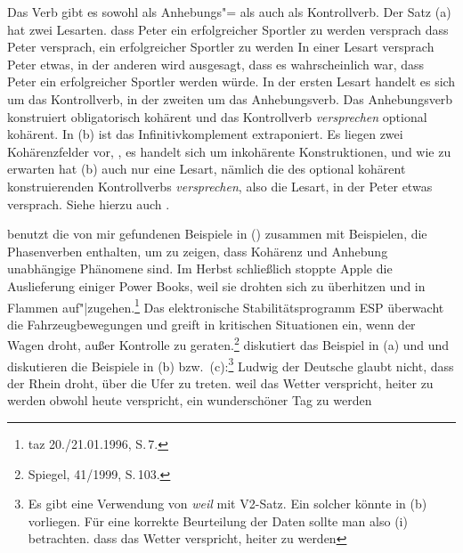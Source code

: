 Das Verb  gibt es sowohl als Anhebungs"= als auch als Kontrollverb. Der Satz
(a) hat zwei Lesarten. 
\eal
\label{bsp-kontrast-raising-extraposition}
\ex
dass Peter ein erfolgreicher Sportler zu werden versprach
\ex\label{ex-versprach-ein-x-zu-werden} 
dass Peter versprach, ein erfolgreicher Sportler zu werden
\zl
In einer Lesart versprach Peter etwas, in der anderen
wird ausgesagt, dass es wahrscheinlich war, dass Peter ein erfolgreicher
Sportler werden würde. In der ersten Lesart handelt es sich um das Kontrollverb, in der
zweiten um das Anhebungsverb.
Das Anhebungsverb konstruiert obligatorisch kohärent und das Kontrollverb
\emph{versprechen} optional kohärent. In (b) ist das Infinitivkomplement extraponiert.
Es liegen zwei Kohärenzfelder vor, \dash, es handelt sich um inkohärente Konstruktionen, 
und wie zu erwarten hat (b) auch nur eine Lesart, nämlich die des optional kohärent
konstruierenden Kontrollverbs \emph{versprechen}, also die Lesart, in der
Peter etwas versprach. Siehe hierzu auch .

\citet[]{Meurers2000b} benutzt die von mir gefundenen Beispiele 
in () zusammen mit Beispielen, die Phasenverben enthalten, um zu zeigen,
dass Kohärenz und Anhebung unabhängige Phänomene sind.
\eal{}
\ex 
Im Herbst schließlich stoppte Apple die Auslieferung einiger Power Books, weil sie drohten
     sich zu überhitzen und in Flammen auf"|zugehen.\footnote{
         taz 20./21.01.1996, S.\,7.
    }
\ex
Das elektronische Stabilitätsprogramm ESP überwacht die Fahrzeugbewegungen und greift 
     in kritischen Situationen ein, wenn der Wagen droht, außer Kontrolle zu geraten.\footnote{
        Spiegel, 41/1999, S.\,103.
    }
\zl
\citet[]{Fanselow87a} diskutiert das Beispiel in 
(a) und \citet[]{Rosengren92a} und
\citet[]{Cook2001a} diskutieren die Beispiele in (b) bzw.\ (c):\footnote{
  Es gibt eine Verwendung von \emph{weil} mit V2-Satz. Ein solcher könnte in
  (b) vorliegen. Für eine korrekte Beurteilung der Daten sollte man also
  (i) betrachten.
  \ea
  dass das Wetter verspricht, heiter zu werden
  \zlast
}
\eal
\ex Ludwig der Deutsche glaubt nicht, dass der Rhein droht, über die Ufer zu treten.
\ex weil das Wetter verspricht, heiter zu werden
\ex obwohl heute verspricht, ein wunderschöner Tag zu werden
\zl


